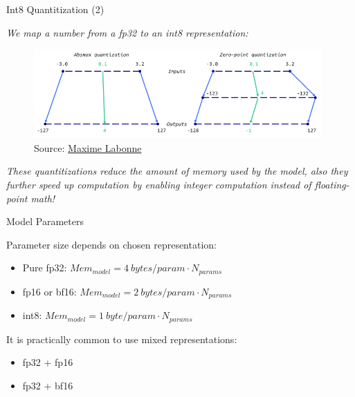 
\begin{vbframe}{Int8 Quantitization (2)}

\textit{We map a number from a fp32 to an int8 representation:}

\vfill

\begin{figure}
	\centering
	\includegraphics[width = 11cm]{./figure/intquant.png} \\ 
	{\footnotesize Source: \href{https://mlabonne.github.io/blog/posts/Introduction_to_Weight_Quantization.html}{Maxime Labonne}}
\end{figure}

\vfill

\textit{These quantitizations reduce the amount of memory used by the model, also they further speed up computation by enabling integer computation instead of floating-point math!} 
    
\end{vbframe}


\begin{vbframe}{Model Parameters}

\vfill

Parameter size depends on chosen representation: \newline

\begin{itemize}
 	\item Pure fp32: $Mem_{model} = 4 ~bytes/param \cdot N_{params}$
 	\item fp16 or bf16: $Mem_{model} = 2 ~bytes/param \cdot N_{params}$
	\item int8: $Mem_{model} = 1 ~byte/param \cdot N_{params}$
\end{itemize}

\vskip8mm

It is practically common to use mixed representations: \newline

\begin{itemize}
 	\item fp32 + fp16
	\item fp32 + bf16
\end{itemize}

\vfill

\end{vbframe}

